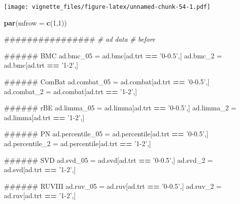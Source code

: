 \documentclass[]{book}
\newenvironment{Shaded}{\begin{snugshade}}{\end{snugshade}}
\newcommand{\KeywordTok}[1]{\textcolor[rgb]{0.13,0.29,0.53}{\textbf{#1}}}
\newcommand{\DataTypeTok}[1]{\textcolor[rgb]{0.13,0.29,0.53}{#1}}
\newcommand{\DecValTok}[1]{\textcolor[rgb]{0.00,0.00,0.81}{#1}}
\newcommand{\StringTok}[1]{\textcolor[rgb]{0.31,0.60,0.02}{#1}}
\newcommand{\CommentTok}[1]{\textcolor[rgb]{0.56,0.35,0.01}{\textit{#1}}}
\newcommand{\OperatorTok}[1]{\textcolor[rgb]{0.81,0.36,0.00}{\textbf{#1}}}
\newcommand{\NormalTok}[1]{#1}
\begin{document}
\texttt{[image: vignette\_files/figure-latex/unnamed-chunk-54-1.pdf]}

\begin{Shaded}
\begin{Highlighting}[]
\KeywordTok{par}\NormalTok{(}\DataTypeTok{mfrow =} \KeywordTok{c}\NormalTok{(}\DecValTok{1}\NormalTok{,}\DecValTok{1}\NormalTok{))}
\end{Highlighting}
\end{Shaded}

\begin{Shaded}
\begin{Highlighting}[]
\NormalTok{################}
\CommentTok{# ad data}
\CommentTok{# before}

\NormalTok{###### BMC}
\NormalTok{ad.bmc_}\DecValTok{05}\NormalTok{ =}\StringTok{ }\NormalTok{ad.bmc[ad.trt }\OperatorTok{==}\StringTok{ '0-0.5'}\NormalTok{,]}
\NormalTok{ad.bmc_}\DecValTok{2}\NormalTok{ =}\StringTok{ }\NormalTok{ad.bmc[ad.trt }\OperatorTok{==}\StringTok{ '1-2'}\NormalTok{,]}

\NormalTok{###### ComBat}
\NormalTok{ad.combat_}\DecValTok{05}\NormalTok{ =}\StringTok{ }\NormalTok{ad.combat[ad.trt }\OperatorTok{==}\StringTok{ '0-0.5'}\NormalTok{,]}
\NormalTok{ad.combat_}\DecValTok{2}\NormalTok{ =}\StringTok{ }\NormalTok{ad.combat[ad.trt }\OperatorTok{==}\StringTok{ '1-2'}\NormalTok{,]}

\NormalTok{###### rBE}
\NormalTok{ad.limma_}\DecValTok{05}\NormalTok{ =}\StringTok{ }\NormalTok{ad.limma[ad.trt }\OperatorTok{==}\StringTok{ '0-0.5'}\NormalTok{,]}
\NormalTok{ad.limma_}\DecValTok{2}\NormalTok{ =}\StringTok{ }\NormalTok{ad.limma[ad.trt }\OperatorTok{==}\StringTok{ '1-2'}\NormalTok{,]}

\NormalTok{###### PN}
\NormalTok{ad.percentile_}\DecValTok{05}\NormalTok{ =}\StringTok{ }\NormalTok{ad.percentile[ad.trt }\OperatorTok{==}\StringTok{ '0-0.5'}\NormalTok{,]}
\NormalTok{ad.percentile_}\DecValTok{2}\NormalTok{ =}\StringTok{ }\NormalTok{ad.percentile[ad.trt }\OperatorTok{==}\StringTok{ '1-2'}\NormalTok{,]}

\NormalTok{###### SVD}
\NormalTok{ad.svd_}\DecValTok{05}\NormalTok{ =}\StringTok{ }\NormalTok{ad.svd[ad.trt }\OperatorTok{==}\StringTok{ '0-0.5'}\NormalTok{,]}
\NormalTok{ad.svd_}\DecValTok{2}\NormalTok{ =}\StringTok{ }\NormalTok{ad.svd[ad.trt }\OperatorTok{==}\StringTok{ '1-2'}\NormalTok{,]}

\NormalTok{###### RUVIII}
\NormalTok{ad.ruv_}\DecValTok{05}\NormalTok{ =}\StringTok{ }\NormalTok{ad.ruv[ad.trt }\OperatorTok{==}\StringTok{ '0-0.5'}\NormalTok{,]}
\NormalTok{ad.ruv_}\DecValTok{2}\NormalTok{ =}\StringTok{ }\NormalTok{ad.ruv[ad.trt }\OperatorTok{==}\StringTok{ '1-2'}\NormalTok{,]}
\end{Highlighting}
\end{Shaded}
\end{document}
